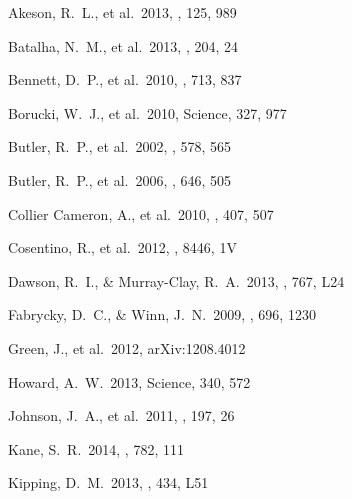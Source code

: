 \begin{thebibliography}

 Akeson, R.~L., et al.\ 2013, 
\pasp, 125, 989 %

 Batalha, N.~M., et al.\ 2013, 
\apjs, 204, 24 %

 Bennett, D.~P., et al.\ 2010, 
\apj, 713, 837 %

 Borucki, W.~J., et al.\ 2010, 
Science, 327, 977 %

 Butler, R.~P., et al.\ 2002, 
\apj, 578, 565 %

 Butler, R.~P., et al.\ 2006, 
\apj, 646, 505 %

 Collier 
Cameron, A., et al.\ 2010, \mnras, 407, 507 %

 Cosentino, R., et al.\ 
2012, \procspie, 8446, 1V %

 Dawson, R.~I., \&
  Murray-Clay, R.~A.\ 2013, \apjl, 767, L24  %

 Fabrycky, D.~C., \&
  Winn, J.~N.\ 2009, \apj, 696, 1230 %
  
 Green, J., et al.\ 2012, 
arXiv:1208.4012   %

 Howard, A.~W.\ 2013, Science, 340,
  572 %

 Johnson, J.~A., et al.\ 2011, 
\apjs, 197, 26 %
  
 Kane, S.~R.\ 2014, \apj, 782, 111 %
  
 Kipping, D.~M.\ 2013, \mnras,
  434, L51 %


\end{thebibliography}
